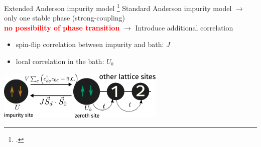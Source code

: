 \documentclass[11pt,aspectratio=169]{beamer}
\newcommand{\focus}[1]{\textcolor{red}{\bf{#1}}}
\begin{document}
\begin{frame}{Extended Anderson impurity model}
\footcite{anderson_1961,hrk_wilson_1980,hewson1993}
Standard Anderson impurity model \(\longrightarrow\) only one stable phase (strong-coupling) \\[10pt]
\focus{no possibility of phase transition} \(\longrightarrow\) Introduce additional correlation\\[20pt]
\begin{itemize}
	\item spin-flip correlation between impurity and bath: \(J\)
	\item local correlation in the bath: \(U_b\)
\end{itemize}

\vspace*{\fill}

\includegraphics[width=0.6\textwidth]{zeromode_bare.pdf}

\end{frame}
\end{document}
